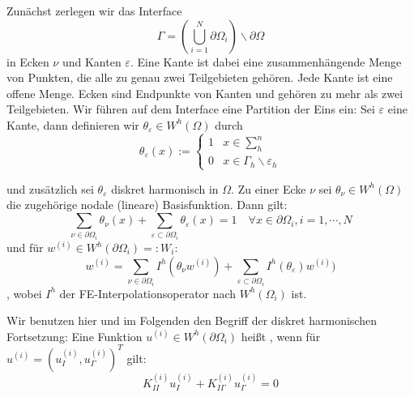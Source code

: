 Zunächst zerlegen wir das Interface 
\[
  \Gamma = \left( \bigcup_{i=1}^N \partial\Omega_i \right) \backslash \partial\Omega
\]
in Ecken $\nu$ und Kanten $\varepsilon$. Eine Kante ist dabei eine zusammenhängende Menge von Punkten, die alle zu genau zwei Teilgebieten gehören. Jede Kante ist eine offene Menge. Ecken sind Endpunkte von Kanten und gehören zu mehr als zwei Teilgebieten. Wir führen auf dem Interface eine Partition der Eins ein: 
Sei $\varepsilon$ eine Kante, dann definieren wir $\theta_{\varepsilon} \in W^h(\Omega)$ durch
\[
  \theta_{\varepsilon}(x):= 
  \begin{cases}
    1 &x\in \sum_h^n\\
    0 &x\in \Gamma_h\backslash\varepsilon_h
  \end{cases}
\]

und zusätzlich sei $\theta_\varepsilon$ diskret harmonisch in $\Omega$. Zu einer Ecke $\nu$ sei $\theta_\nu\in W^h(\Omega)$ die zugehörige nodale (lineare) Basisfunktion. Dann gilt: 
\[
  \sum_{\nu\in\partial\Omega_i} \theta_\nu(x) + \sum_{\varepsilon\subset\partial\Omega_i} \theta_\varepsilon(x) =1 \quad \forall x\in \partial\Omega_i, i=1,\cdots,N
\]
und für $w^{(i)}\in W^h(\partial\Omega_i)=: W_i$:
\[
  w^{(i)}=\sum_{\nu\in\partial\Omega_i} I^h(\theta_\nu w^{(i)})+\sum_{\varepsilon\subset\partial\Omega_i} I^h(\theta_\varepsilon)w^{(i)})
\],
wobei $I^h$ der FE-Interpolationsoperator nach $W^h(\Omega_i)$ ist. 


Wir benutzen hier und im Folgenden den Begriff der diskret harmonischen Fortsetzung: 
Eine Funktion $u^{(i)}\in W^h(\partial\Omega_i)$ heißt , wenn für $u^{(i)}=(u_I^{(i)},u_\Gamma^{(i)})^T$ gilt:
\[
  K_{II}^{(i)}u_I^{(i)}+K_{I\Gamma}^{(i)}u_\Gamma^{(i)} = 0 
\]
